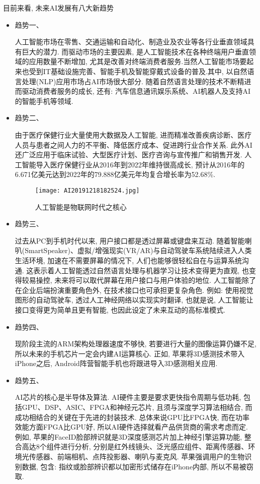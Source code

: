 目前来看, 未来AI发展有八大新趋势
\begin{itemize}
\item  趋势一、

人工智能市场在零售、交通运输和自动化、制造业及农业等各行业垂直领域具有巨大的潜力. 而驱动市场的主要因素, 是人工智能技术在各种终端用户垂直领域的应用数量不断增加, 尤其是改善对终端消费者服务.当然人工智能市场要起来也受到IT基础设施完善、智能手机及智能穿戴式设备的普及.其中, 以自然语言处理(NLP)应用市场占AI市场很大部分. 随着自然语言处理的技术不断精进而驱动消费者服务的成长, 还有: 汽车信息通讯娱乐系统、AI机器人及支持AI的智能手机等领域.
\item  趋势二、

由于医疗保健行业大量使用大数据及人工智能, 进而精准改善疾病诊断、医疗人员与患者之间人力的不平衡、降低医疗成本、促进跨行业合作关系. 此外AI还广泛应用于临床试验、大型医疗计划、医疗咨询与宣传推广和销售开发. 人工智能导入医疗保健行业从2016年到2022年维持很高成长, 预计从2016年的6.671亿美元达到2022年的79.888亿美元年均复合增长率为52.68\%.
\begin{figure}[htbp]
	\centering
	\texttt{[image: AI20191218182524.jpg]}
	\caption{人工智能是物联网时代之核心}
   \label{AI20191218182524}
\end{figure}

\item  趋势三、

过去从PC到手机时代以来, 用户接口都是透过屏幕或键盘来互动. 随着智能喇叭(SmartSpeaker)、虚拟/增强现实(VR/AR)与自动驾驶车系统陆续进入人类生活环境, 加速在不需要屏幕的情况下, 人们也能够很轻松自在与运算系统沟通. 这表示着人工智能透过自然语言处理与机器学习让技术变得更为直观, 也变得较易操控, 未来将可以取代屏幕在用户接口与用户体验的地位. 人工智能除了在企业后端扮演重要角色外, 在技术接口也可承担更复杂角色. 例如: 使用视觉图形的自动驾驶车, 透过人工神经网络以实现实时翻译, 也就是说, 人工智能让接口变得更为简单且更有智能, 也因此设定了未来互动的高标准模式.
\item  趋势四、

现阶段主流的ARM架构处理器速度不够快, 若要进行大量的图像运算仍嫌不足, 所以未来的手机芯片一定会内建AI运算核心. 正如, 苹果将3D感测技术带入iPhone之后, Android阵营智能手机也将跟进导入3D感测相关应用.
\item  趋势五、

AI芯片的核心是半导体及算法. AI硬件主要是要求更快指令周期与低功耗, 包括GPU、DSP、ASIC、FPGA和神经元芯片, 且须与深度学习算法相结合, 而成功相结合的关键在于先进的封装技术. 总体来说GPU比FPGA快, 而在功率效能方面FPGA比GPU好, 所以AI硬件选择就看产品供货商的需求考虑而定. 例如, 苹果的FaceID脸部辨识就是3D深度感测芯片加上神经引擎运算功能, 整合高达8个组件进行分析, 分别是红外线镜头、泛光感应组件、距离传感器、环境光传感器、前端相机、点阵投影器、喇叭与麦克风. 苹果强调用户的生物识别数据, 包含: 指纹或脸部辨识都以加密形式储存在iPhone内部, 所以不易被窃取.


\end{itemize}
